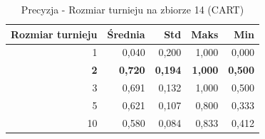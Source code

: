 \begin{table}[htbp]
\centering
\small
\setlength{\tabcolsep}{6pt}
\renewcommand{\arraystretch}{1.2}
\caption{Precyzja - Rozmiar turnieju na zbiorze 14 (CART)}
\label{tab:CART_tournament_size_14_precision}
\begin{tabular}{r|r|r|r|r}
\toprule
Rozmiar turnieju & Średnia & Std & Maks & Min \\
\hline
1 & 0,040 & 0,200 & 1,000 & 0,000 \\
\textbf{2} & \textbf{0,720} & \textbf{0,194} & \textbf{1,000} & \textbf{0,500} \\
3 & 0,691 & 0,132 & 1,000 & 0,500 \\
5 & 0,621 & 0,107 & 0,800 & 0,333 \\
10 & 0,580 & 0,084 & 0,833 & 0,412 \\
\bottomrule
\end{tabular}
\end{table}